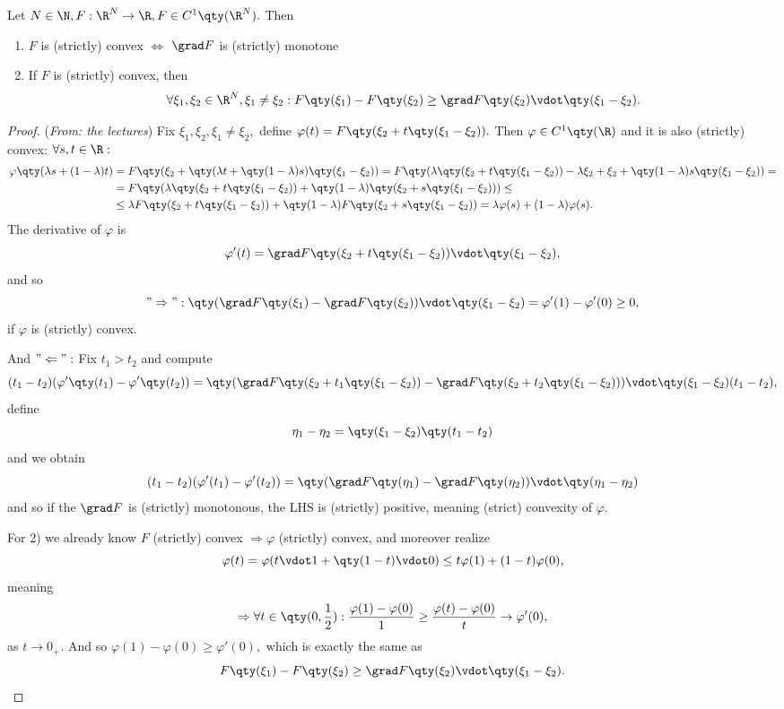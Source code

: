 \begin{lemma}
	Let $N \in \N, F: \R^N \to \R, F \in C^1\qty(\R^N).$ Then 
	\begin{enumerate}
		\item $F$ is (strictly) convex $\Leftrightarrow$ $\grad F$ is (strictly) monotone
		\item If $F$ is (strictly) convex, then
			\[
				\forall \xi_1, \xi_2 \in \R^N, \xi_1 \neq \xi_2: F\qty(\xi_1)-F\qty(\xi_2)\geq \grad F\qty(\xi_2)\vdot \qty(\xi_1 - \xi_2).
			\]
	\end{enumerate}
\end{lemma}
\begin{proof}(\textit{From: the lectures})
	Fix $\xi_1, \xi_2, \xi_1 \neq \xi_2,$ define $\varphi(t) = F\qty(\xi_2 + t\qty(\xi_1 - \xi_2)).$ Then $\varphi \in C^1\qty(\R)$ and it is also (strictly) convex: $\forall s,t \in \R:$ 
	\begin{align*}
		\varphi\qty(\lambda s + (1- \lambda)t) &= F\qty(\xi_2 + \qty(\lambda t + \qty(1-\lambda)s)\qty(\xi_1 - \xi_2)) = F\qty(\lambda\qty(\xi_2 + t\qty(\xi_1 - \xi_2))- \lambda \xi_2 + \xi_2 + \qty(1-\lambda)s\qty(\xi_1 - \xi_2)) = \\
						       &= F\qty(\lambda\qty(\xi_2 + t\qty(\xi_1 - \xi_2))+ \qty(1- \lambda)\qty(\xi_2 + s\qty(\xi_1 - \xi_2))) \leq \\
						       &\leq \lambda F\qty(\xi_2 + t\qty(\xi_1 - \xi_2)) + \qty(1- \lambda)F\qty(\xi_2 +s \qty(\xi_1 - \xi_2)) = \lambda \varphi(s) + (1-\lambda) \varphi(s).
	\end{align*}
	The derivative of $\varphi$ is 
	\[
		\varphi'(t) = \grad F\qty(\xi_2 +t\qty(\xi_1 - \xi_2))\vdot \qty(\xi_1 - \xi_2),
	\]
	and so
	\[
		"\Rightarrow": \qty(\grad F\qty(\xi_1) - \grad F\qty(\xi_2))\vdot\qty(\xi_1-\xi_2) = \varphi'(1)-\varphi'(0) \geq 0,
	\]
	if $\varphi$ is (strictly) convex.
	
	And $"\Leftarrow":$ Fix $t_1 > t_2$ and compute
	\[
		(t_1 - t_2)	(\varphi'\qty(t_1) - \varphi'\qty(t_2)) = \qty(\grad F\qty(\xi_2 + t_1\qty(\xi_1 - \xi_2))- \grad F\qty(\xi_2 + t_2\qty(\xi_1-\xi_2)))\vdot\qty(\xi_1-\xi_2)(t_1-t_2),
	\]
	define
	\[
		\eta_1 - \eta_2 = \qty(\xi_1 - \xi_2)\qty(t_1-t_2)
	\]
	and we obtain
	\[
		(t_1 - t_2)(\varphi'(t_1) - \varphi'(t_2)) = \qty(\grad F\qty(\eta_1)-\grad F\qty(\eta_2))\vdot \qty(\eta_1 - \eta_2)
	\]
	and so if the $\grad F$ is (strictly) monotonous, the LHS is (strictly) positive, meaning  (strict) convexity of $\varphi$.

	For 2) we already know $F$ (strictly) convex $\Rightarrow \varphi$ (strictly) convex, and moreover realize
	\[
		\varphi(t) = \varphi(t \vdot 1 + \qty(1- t)\vdot0) \leq t \varphi(1) + (1-t) \varphi(0),
	\]
	meaning
	\[
		\Rightarrow \forall t \in \qty(0,\frac{1}{2}): \frac{\varphi(1)-\varphi(0)}{1} \geq \frac{\varphi(t)-\varphi(0)}{t}\to \varphi'(0),
	\]
	as $t\to 0_+.$ And so $\varphi(1) - \varphi(0) \geq \varphi'(0),$ which is exactly the same as
	\[
		F\qty(\xi_1) - F\qty(\xi_2) \geq \grad F\qty(\xi_2)\vdot \qty(\xi_1 - \xi_2).
	\]
\end{proof}

